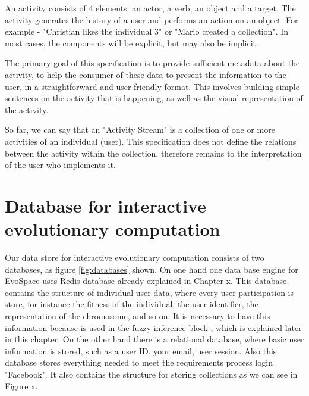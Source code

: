 An activity consists of 4 elements: an actor, a verb, an object and a target. The activity generates the history of a user and performs an action on an object. For example - "Christian likes the individual 3" or "Mario created a collection". In most cases, the components will be explicit, but may also be implicit.

The primary goal of this specification is to provide sufficient metadata about the activity, to help the consumer of these data to present the information to the user, in a straightforward and user-friendly format. This involves building simple sentences on the activity that is happening, as well as the visual representation of the activity.

So far, we can say that an "Activity Stream" is a collection of one or more activities of an individual (user).
This specification does not define the relations between the activity within the collection, therefore remains to the interpretation of the user who implements it.

\section{Database for interactive evolutionary computation}
Our data store for interactive evolutionary computation consists of two databases, as figure \ref{fig:databases} shown. On one hand one  data base  engine for EvoSpace uses Redis database already explained in Chapter x.  This database contains the structure of individual-user data, where every user participation is store, for instance the fitness of the individual, the  user identifier, the representation of the chromosome, and so on. It is necessary to have this information because is used in the fuzzy inference block , which is explained later in this chapter. 
On the other hand there is a relational database, where basic user information is stored, such as a user ID, your email, user session. Also this database  stores everything needed to meet the requirements process login "Facebook". It also contains the structure for storing collections as we can see in Figure x.

